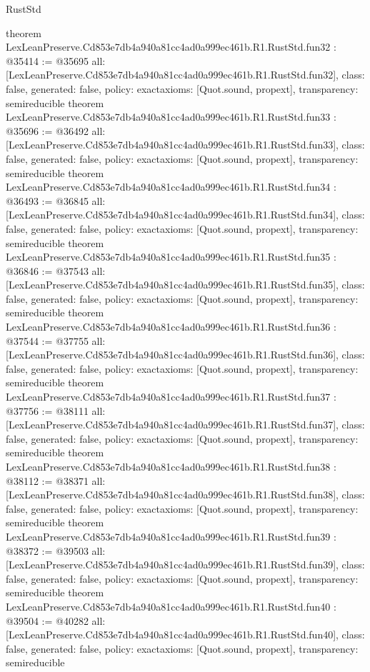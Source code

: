 \begin{lexlean}{RustStd}
\begin{coremodule}
{}
theorem LexLeanPreserve.Cd853e7db4a940a81cc4ad0a999ec461b.R1.RustStd.fun32 : @35414 := @35695 {
  all: [LexLeanPreserve.Cd853e7db4a940a81cc4ad0a999ec461b.R1.RustStd.fun32],
  class: false,
  generated: false,
  policy: exact{axioms: [Quot.sound, propext]},
  transparency: semireducible
}
theorem LexLeanPreserve.Cd853e7db4a940a81cc4ad0a999ec461b.R1.RustStd.fun33 : @35696 := @36492 {
  all: [LexLeanPreserve.Cd853e7db4a940a81cc4ad0a999ec461b.R1.RustStd.fun33],
  class: false,
  generated: false,
  policy: exact{axioms: [Quot.sound, propext]},
  transparency: semireducible
}
theorem LexLeanPreserve.Cd853e7db4a940a81cc4ad0a999ec461b.R1.RustStd.fun34 : @36493 := @36845 {
  all: [LexLeanPreserve.Cd853e7db4a940a81cc4ad0a999ec461b.R1.RustStd.fun34],
  class: false,
  generated: false,
  policy: exact{axioms: [Quot.sound, propext]},
  transparency: semireducible
}
theorem LexLeanPreserve.Cd853e7db4a940a81cc4ad0a999ec461b.R1.RustStd.fun35 : @36846 := @37543 {
  all: [LexLeanPreserve.Cd853e7db4a940a81cc4ad0a999ec461b.R1.RustStd.fun35],
  class: false,
  generated: false,
  policy: exact{axioms: [Quot.sound, propext]},
  transparency: semireducible
}
theorem LexLeanPreserve.Cd853e7db4a940a81cc4ad0a999ec461b.R1.RustStd.fun36 : @37544 := @37755 {
  all: [LexLeanPreserve.Cd853e7db4a940a81cc4ad0a999ec461b.R1.RustStd.fun36],
  class: false,
  generated: false,
  policy: exact{axioms: [Quot.sound, propext]},
  transparency: semireducible
}
theorem LexLeanPreserve.Cd853e7db4a940a81cc4ad0a999ec461b.R1.RustStd.fun37 : @37756 := @38111 {
  all: [LexLeanPreserve.Cd853e7db4a940a81cc4ad0a999ec461b.R1.RustStd.fun37],
  class: false,
  generated: false,
  policy: exact{axioms: [Quot.sound, propext]},
  transparency: semireducible
}
theorem LexLeanPreserve.Cd853e7db4a940a81cc4ad0a999ec461b.R1.RustStd.fun38 : @38112 := @38371 {
  all: [LexLeanPreserve.Cd853e7db4a940a81cc4ad0a999ec461b.R1.RustStd.fun38],
  class: false,
  generated: false,
  policy: exact{axioms: [Quot.sound, propext]},
  transparency: semireducible
}
theorem LexLeanPreserve.Cd853e7db4a940a81cc4ad0a999ec461b.R1.RustStd.fun39 : @38372 := @39503 {
  all: [LexLeanPreserve.Cd853e7db4a940a81cc4ad0a999ec461b.R1.RustStd.fun39],
  class: false,
  generated: false,
  policy: exact{axioms: [Quot.sound, propext]},
  transparency: semireducible
}
theorem LexLeanPreserve.Cd853e7db4a940a81cc4ad0a999ec461b.R1.RustStd.fun40 : @39504 := @40282 {
  all: [LexLeanPreserve.Cd853e7db4a940a81cc4ad0a999ec461b.R1.RustStd.fun40],
  class: false,
  generated: false,
  policy: exact{axioms: [Quot.sound, propext]},
  transparency: semireducible
}
\end{coremodule}
\end{lexlean}
